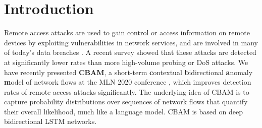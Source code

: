 %
%


\section{Introduction}





Remote access attacks are used to gain control or access information on remote devices by exploiting vulnerabilities in network services, and are involved in many of today's data breaches \cite{mandiant2015trends}.
A recent survey \cite{nisioti2018intrusion} showed that these attacks are detected at significantly lower rates than more high-volume probing or DoS attacks. 
We have recently presented \textbf{CBAM}, a short-term \textbf{c}ontextual \textbf{b}idirectional \textbf{a}nomaly \textbf{m}odel of network flows at the MLN 2020 conference \cite{clausen2021better}, which improves detection rates of remote access attacks significantly. The underlying idea of CBAM is to capture probability distributions over sequences of network flows that quantify their overall likelihood, much like a language model. 
CBAM is based on deep bidirectional LSTM networks. 

